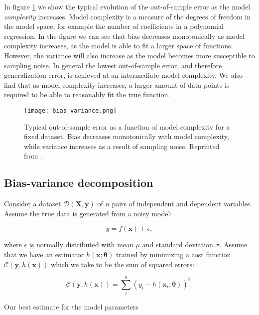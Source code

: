 In figure \ref{fig:bias-variance} we show the typical evolution
of the out-of-sample error as the model \textit{complexity} increases.
Model complexity is a measure of the degrees of freedom in the model space,
for example the number of coefficients in a polynomial regression.
In the figure we can see that bias decreases monotonically as model complexity
increases, as the model is able to fit a larger space of functions.
However, the variance will also increase as the model becomes more
susceptible to sampling noise. In general the lowest out-of-sample error,
and therefore generalization error, is achieved at an intermediate
model complexity. We also find that as model complexity increases,
a larger amount of data points is required to be able to reasonably
fit the true function.

\begin{figure}[h]
    \centering
    \texttt{[image: bias\_variance.png]}
    \caption{Typical out-of-sample error as a function
    of model complexity for a fixed dataset. Bias decreases monotonically with
    model complexity, while variance increases as a result of
    sampling noise. Reprinted from \parencite[Mehta et al. page 11]{
        mehta2019high}.}
    \label{fig:bias-variance}
\end{figure}

\subsection{Bias-variance decomposition}
Consider a dataset $\mathcal{D}(\bm{X}, \bm{y})$ of $n$ pairs
of independent and dependent variables. Assume the true data
is generated from a noisy model:

\begin{equation}
 y = f(\bm{x}) + \epsilon ,
\end{equation}

where $\epsilon$ is normally distributed with mean $\mu$ and
standard deviation $\sigma$. Assume that we have an estimator $h(\bm{x}; \bm{\theta})$
trained by minimizing a cost function $\mathcal{C}(\bm{y}, h(\bm{x}))$
which we take to be the sum of squared errors:

\begin{equation}
 \mathcal{C}(\bm{y}, h(\bm{x})) = \sum_i^n (y_i - h(\bm{x}_i; \bm{\theta}))^2 .
\end{equation}

Our best estimate for the model parameters

